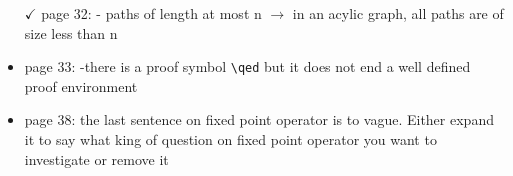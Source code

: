 \documentclass[a4paper]{article}
\begin{document}
\begin{itemize}
	\item[$\checkmark$] page 32: 
	- paths of length at most n $\to$ in an acylic graph, all paths are of size less than n
	\item page 33:
	-there is a proof symbol \verb|\qed| but it does not end a well defined proof environment
	
	\item page 38: 
	the last sentence on fixed point operator is to vague. Either expand it to 
	say what king of question on fixed point operator you want to investigate or remove it	
\end{itemize}

	
\end{document}
